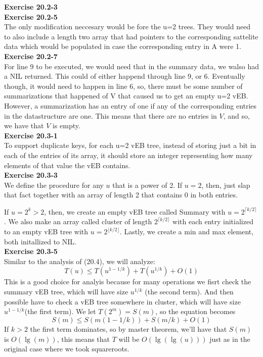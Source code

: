 \documentclass{article}
\begin{document}
\noindent\textbf{Exercise 20.2-3}\\

\noindent\textbf{Exercise 20.2-5}\\
The only modification neccesary would be fore the u=2 trees. They would need to also include a length two array that had pointers to the corresponding sattelite data which would be populated in case the corresponding entry in A were 1.\\

\noindent\textbf{Exercise 20.2-7}\\
For line 9 to be executed, we would need that in the summary data, we walso had a NIL returned. This could of either happend through line 9, or 6. Eventually though, it would need to happen in line 6, so, there must be some number of summarizations that happened of V that caused us to get an empty u=2 vEB. However, a summarization has an entry of one if any of the corresponding entries in the datastructure are one. This means that there are no entries in $V$, and so, we have that $V$ is empty.\\

\noindent\textbf{Exercise 20.3-1}\\
To support duplicate keys, for each u=2 vEB tree, instead of storing just a bit in each of the entries of its array, it should store an integer representing how many elements of that value the vEB contains.\\

\noindent\textbf{Exercise 20.3-3}\\
We define the procedure for any $u$ that is a power of 2. If $u=2$, then, just slap that fact together with an array of length 2 that contains 0 in both entries. 

If $u = 2^k > 2$, then, we create an empty vEB tree called Summary with $u= 2^{\lceil k/2\rceil}$. We also make an array called cluster of length $2^{\lceil k/2\rceil}$ with each entry initialized to an empty vEB tree with $u = 2^{\lfloor k/2\rfloor}$. Lastly, we create a min and max element, both initallized to NIL.\\

\noindent\textbf{Exercise 20.3-5}\\
Similar to the analysis of (20.4), we will analyze:
\[
T(u) \le T(u^{1-1/k}) + T(u^{1/k}) + O(1)
\]
This is a good choice for analyis because for many operations we fisrt check the summary vEB tree, which will have size $u^{1/k}$ (the second term). And then possible have to check a vEB tree somewhere in cluster, which will have size $u^{1-1/k}$(the first term). We let $T(2^m) = S(m)$, so the equation becomes
\[
S(m) \le S(m(1-1/k)) + S(m/k) + O(1)
\]
If $k>2$ the first term dominates, so by master theorem, we'll have that $S(m)$ is $O(\lg(m))$, this means that $T$ will be $O(\lg(\lg(u)))$ just as in the original case where we took squareroots.
\end{document}
